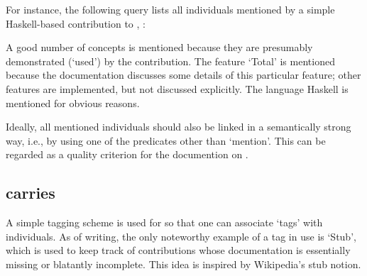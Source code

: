 For instance, the following query lists all individuals mentioned by a
simple Haskell-based contribution to \ooo{},
:



\noindent
A good number of concepts is mentioned because they are presumably
demonstrated (`used') by the contribution. The feature `Total' is
mentioned because the documentation discusses some details of this
particular feature; other features are implemented, but not discussed
explicitly. The language Haskell is mentioned for obvious reasons.

Ideally, all mentioned individuals should also be linked in a
semantically strong way, i.e., by using one of the predicates other
than `mention'. This can be regarded as a quality criterion for the
documention on .


\subsection{carries}

A simple tagging scheme is used for \solasote{} so that one can
associate `tags' with individuals. As of writing, the only noteworthy
example of a tag in use is `Stub', which is used to keep track of
contributions whose documentation is essentially missing or blatantly
incomplete. This idea is inspired by Wikipedia's stub notion.

